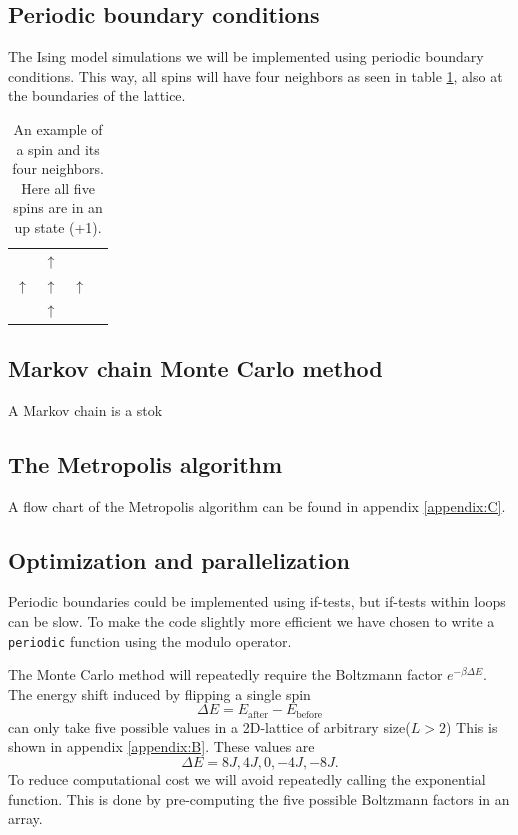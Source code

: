 \documentclass[english,notitlepage,reprint,nofootinbib]{revtex4-1}  %
\begin{document}
\subsection*{Periodic boundary conditions}
The Ising model simulations we will be implemented using periodic boundary conditions. This way, all spins will have four neighbors as seen in table \ref{tab:neighbors}, also at the boundaries of the lattice.
\begin{table}[H]
    \centering
    \begin{tabular}{llll}
       & $\uparrow$ &    \\
    $\uparrow$ & $\uparrow$ & $\uparrow$ \\
       & $\uparrow$ & 
    \end{tabular}\label{tab:neighbors}
    \caption{An example of a spin and its four neighbors. Here all five spins are in an up state (+1).} 
\end{table}

\subsection*{Markov chain Monte Carlo method}
A Markov chain is a stok

\subsection*{The Metropolis algorithm}
A flow chart of the Metropolis algorithm can be found in appendix \ref{appendix:C}.

\subsection*{Optimization and parallelization}
Periodic boundaries could be implemented using if-tests, but if-tests within loops can be slow. To make the code slightly more efficient we have chosen to write a \texttt{periodic} function using the modulo operator.

The Monte Carlo method will repeatedly require the Boltzmann factor $e^{-\beta \Delta E}$. The energy shift induced by flipping a single spin 
\begin{equation}
    \Delta E = E_{\text{after}} - E_{\text{before}}
\end{equation}
can only take five possible values in a 2D-lattice of arbitrary size($L > 2$) This is shown in appendix \ref{appendix:B}. These values are
\begin{equation}
    \Delta E = 8J, 4J, 0, -4J, -8J.
\end{equation}
To reduce computational cost we will avoid repeatedly calling the exponential function. This is done by pre-computing the five possible Boltzmann factors in an array.
\end{document}
